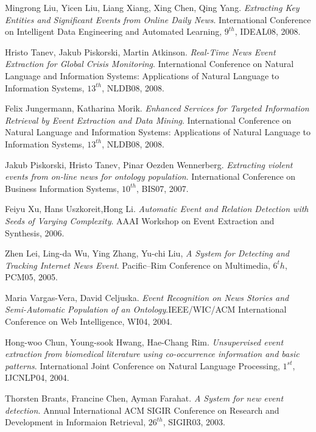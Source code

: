 \begin{thebibliography}{99}
		 	Mingrong Liu, Yicen Liu, Liang Xiang, Xing Chen, Qing Yang. \emph{Extracting Key Entities and Significant Events from Online Daily News}. International Conference on Intelligent Data Engineering and Automated Learning, $9^{th}$, IDEAL08, 2008. 	

		 	Hristo Tanev, Jakub Piskorski, Martin Atkinson. \emph{Real-Time News Event Extraction for Global Crisis Monitoring}. International Conference on Natural Language and Information Systems: Applications of Natural Language to Information Systems, $13^{th}$, NLDB08, 2008.

		  Felix Jungermann, Katharina Morik.  \emph{Enhanced Services for Targeted Information Retrieval by Event Extraction and Data Mining}. International Conference on Natural Language and Information Systems: Applications of Natural Language to Information Systems, $13^{th}$, NLDB08, 2008. 

		  	Jakub Piskorski, Hristo Tanev, Pinar Oezden Wennerberg. \emph{Extracting violent events from on-line news for ontology population}.  International Conference on Business Information Systems, $10^{th}$, BIS07, 2007. 

		 Feiyu Xu, Hans Uszkoreit,Hong Li. \emph{Automatic Event and Relation Detection
with Seeds of Varying Complexity}. AAAI Workshop on Event Extraction and Synthesis, 2006.
		
		 Zhen Lei, Ling-da Wu, Ying Zhang, Yu-chi Liu, \emph{A System for Detecting and Tracking Internet News Event}. Pacific--Rim Conference on Multimedia, $6^th$, PCM05, 2005.

		 	Maria Vargas-Vera, David Celjuska. \emph{Event Recognition on News Stories and Semi-Automatic Population of an Ontology}.IEEE/WIC/ACM International Conference on Web Intelligence, WI04, 2004.


		  	Hong-woo Chun, Young-sook Hwang, Hae-Chang Rim. \emph{Unsupervised event extraction from biomedical literature using co-occurrence information and basic patterns}. International Joint Conference on Natural Language Processing, $1^{st}$, IJCNLP04, 2004. 
   
		 Thorsten Brants, Francine Chen, Ayman Farahat. \emph{A System for new event detection}. Annual International ACM SIGIR Conference on Research and Development in Informaion Retrieval, $26^{th}$, SIGIR03, 2003.


\end{thebibliography}
